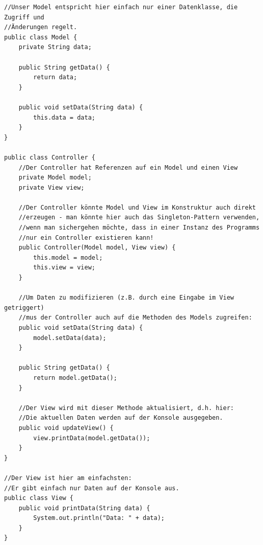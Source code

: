 \documentclass{article}
\begin{document}
\begin{verbatim}
//Unser Model entspricht hier einfach nur einer Datenklasse, die Zugriff und
//Änderungen regelt.
public class Model {
    private String data;

    public String getData() {
        return data;
    }

    public void setData(String data) {
        this.data = data;
    }
}

public class Controller {
    //Der Controller hat Referenzen auf ein Model und einen View
    private Model model;
    private View view;

    //Der Controller könnte Model und View im Konstruktur auch direkt 
    //erzeugen - man könnte hier auch das Singleton-Pattern verwenden,
    //wenn man sichergehen möchte, dass in einer Instanz des Programms
    //nur ein Controller existieren kann!
    public Controller(Model model, View view) {
        this.model = model;
        this.view = view;
    }

    //Um Daten zu modifizieren (z.B. durch eine Eingabe im View getriggert)
    //mus der Controller auch auf die Methoden des Models zugreifen:
    public void setData(String data) {
        model.setData(data);
    }

    public String getData() {
        return model.getData();
    }

    //Der View wird mit dieser Methode aktualisiert, d.h. hier:
    //Die aktuellen Daten werden auf der Konsole ausgegeben.
    public void updateView() {
        view.printData(model.getData());
    }
}

//Der View ist hier am einfachsten:
//Er gibt einfach nur Daten auf der Konsole aus.
public class View {
    public void printData(String data) {
        System.out.println("Data: " + data);
    }
}
\end{verbatim}
\end{document}
